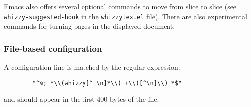 \documentclass{article}
\let \lst \verb
\begin{document}
Emacs also offers several optional commands to move from slice to slice
(see \lst"whizzy-suggested-hook" in the \lst"whizzytex.el" file). 
There are also experimental commands for turning pages in the displayed
document. 


\subsubsection {File-based configuration}

A configuration line is matched by the regular expression:
\begin{verbatim}
        "^%; *\\(whizzy[^ \n]*\\) +\\([^\n]\\) *$"
\end{verbatim}
and should appear in the first 400 bytes of the file. 
\end{document}
